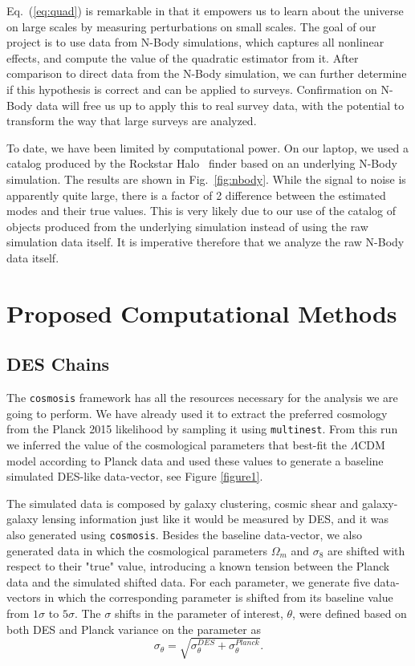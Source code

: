 \documentclass[12pt]{article}
\newcommand{\rf}[1]{\ref{fig:#1}}
\newcommand{\ec}[1]{Eq.~(\ref{eq:#1})}
\begin{document}
\begin{small}
\ec{quad} is remarkable in that it empowers us to learn about the universe on large scales by measuring perturbations on small scales. 
The goal of our project is to use data from N-Body simulations, which captures all nonlinear effects, and compute the value of the quadratic estimator from it. After comparison to direct data from the N-Body simulation, we can further determine if this hypothesis is correct and can be applied to surveys. Confirmation on N-Body data will free us up to apply this to real survey data, with the potential to transform the way that large surveys are analyzed.


To date, we have been limited by computational power. On our laptop, we used a catalog produced by the Rockstar Halo~\cite{2013ApJ...762..109B} finder based on an underlying N-Body simulation. The results are shown in Fig.~\rf{nbody}. While the signal to noise is apparently quite large, there is a factor of 2 difference between the estimated modes and their true values. This is very likely due to our use of the catalog of objects produced from the underlying simulation instead of using the raw simulation data itself. It is imperative therefore that we analyze the raw N-Body data itself.


\section{Proposed Computational Methods}
\subsection{DES Chains}

The {\tt cosmosis} framework has all the resources necessary for the analysis we are going to perform. We have already used it to extract the preferred cosmology from the Planck 2015 likelihood  by sampling it using {\tt multinest}. From this run we inferred the value of the cosmological parameters that best-fit the $\Lambda$CDM model according to Planck data and used these values to generate a baseline simulated DES-like data-vector, see Figure \ref{figure1}.


The simulated data is composed by galaxy clustering, cosmic shear and galaxy-galaxy lensing information just like it would be measured by DES, and it was also generated using {\tt cosmosis}. Besides the baseline data-vector, we also generated data in which the cosmological parameters $\Omega_m$ and $\sigma_8$ are shifted with respect to their "true" value, introducing a known tension between the Planck data and the simulated shifted data. For each parameter, we generate five data-vectors in which the corresponding parameter is shifted from its baseline value from $1\sigma$ to $5\sigma$.  The $\sigma$ shifts in the parameter of interest, $\theta$, were defined based on both DES and Planck variance on the parameter as 
\begin{equation}
    \sigma_{\theta} = \sqrt{\sigma^{DES}_{\theta}+\sigma^{Planck}_{\theta}}.
\end{equation}


\end{small}
\end{document}

